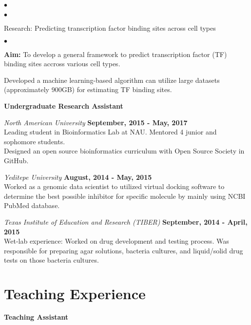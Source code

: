 \documentclass[margin,line]{res}
\newenvironment{list2}{
  \begin{list}{$\bullet$}{%
      \setlength{\itemsep}{0in}
      \setlength{\parsep}{0in} \setlength{\parskip}{0in}
      \setlength{\topsep}{0in} \setlength{\partopsep}{0in}
      \setlength{\leftmargin}{0.2in}}}{\end{list}}
\begin{document}
\begin{resume}
\begin{list2}
\begin{list2}
\end{list2}
\item Research: Predicting transcription factor binding sites across cell types
\begin{list2}
\item {\bf Aim:} To develop a general framework to predict transcription factor (TF) binding sites accross various cell types.
\item Developed a machine learning-based algorithm can utilize large datasets (approximately 900GB) for estimating TF binding sites.
\end{list2}
\end{list2}

{\bf Undergraduate Research Assistant}

\vspace{-.3cm}
{\em North American University} \hfill {\bf September, 2015 - May, 2017}\\
Leading student in Bioinformatics Lab at NAU. Mentored 4 junior and sophomore students.\\
Designed an open source bioinformatics curriculum with Open Source Society in GitHub.

{\em Yeditepe University} \hfill {\bf August, 2014 - May, 2015}\\
Worked as a genomic data scientist to utilized virtual docking software to determine the best possible inhibitor for specific molecule by mainly using NCBI PubMed database.

{\em Texas Institute of Education and Research (TIBER)} \hfill {\bf September, 2014 - April, 2015}\\
Wet-lab experience: Worked on drug development and testing process. Was responsible for preparing agar solutions, bacteria cultures, and liquid/solid drug tests on those bacteria cultures.


\section{\sc Teaching Experience}
{\bf Teaching Assistant}


\end{resume}
\end{document}
